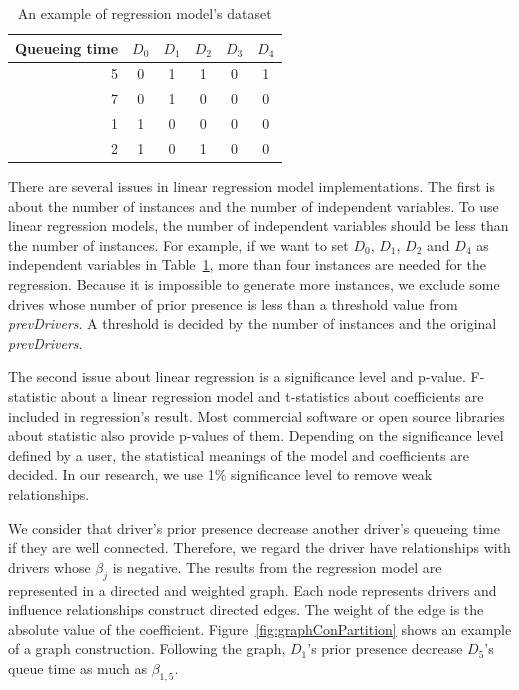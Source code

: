 \documentclass{article}
\begin{document}
\begin{table}[h]
    \caption{An example of regression model's dataset}
    \vspace{-0.3 cm}
    \begin{center}
        \begin{tabular}{r|ccccc}
          Queueing time     & $D_0$    & $D_1$    & $D_2$    & $D_3$    & $D_4$ \\
          \hline
          5                    & 0        & 1        & 1        & 0     & 1\\
          7                    & 0        & 1        & 0        & 0     & 0\\
          1                    & 1        & 0        & 0        & 0     & 0\\
          2                    & 1        & 0        & 1        & 0     & 0
        \end{tabular}
    \label{tab:exampleInfluenceRegression}
    \end{center}
    \vspace{-0.3 cm}
\end{table}

There are several issues in linear regression model implementations. The first is about the number of instances and the number of independent variables. To use linear regression models, the number of independent variables should be less than the number of instances. For example, if we want to set $D_0$, $D_1$, $D_2$ and $D_4$ as independent variables in Table~\ref{tab:exampleInfluenceRegression}, more than four instances are needed for the regression. Because it is impossible to generate more instances, we exclude some drives whose number of prior presence is less than a threshold value from \emph{prevDrivers}. A threshold is decided by the number of instances and the original \emph{prevDrivers}.

The second issue about linear regression is a significance level and p-value. F-statistic about a linear regression model and t-statistics about coefficients are included in regression's result. Most commercial software or open source libraries about statistic also provide p-values of them. Depending on the significance level defined by a user, the statistical meanings of the model and coefficients are decided. In our research, we use 1\% significance level to remove weak relationships. 

We consider that driver's prior presence decrease another driver's queueing time if they are well connected. Therefore, we regard the driver have relationships with drivers whose $\beta_j$ is negative. The results from the regression model are represented in a directed and weighted graph. Each node represents drivers and influence relationships construct directed edges. The weight of the edge is the absolute value of the coefficient. Figure~\ref{fig:graphConPartition} shows an example of a graph construction. Following the graph, $D_1$'s prior presence decrease $D_5$'s queue time as much as $\beta_{1,5}$.
\end{document}
